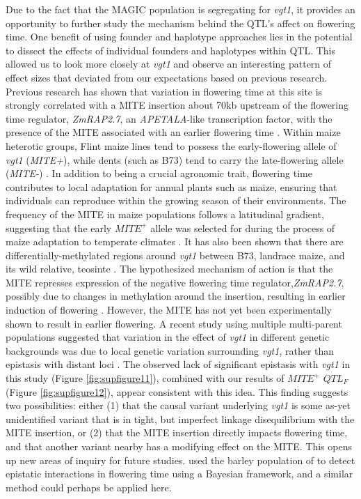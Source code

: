 \documentclass[9pt,twocolumn,twoside]{gsag3jnl}
\begin{document}
Due to the fact that the MAGIC population is segregating for \emph{vgt1}, it provides an opportunity to further study the mechanism behind the QTL's affect on flowering time.
One benefit of using founder and haplotype approaches lies in the potential to dissect the effects of individual founders and haplotypes within QTL.
This allowed us to look more closely at \emph{vgt1} and observe an interesting pattern of effect sizes that deviated from our expectations based on previous research.
Previous research  has shown that variation in flowering time at this site is strongly correlated with a MITE insertion about 70kb upstream of the flowering time regulator, \emph{ZmRAP2.7}, an \emph{APETALA}-like transcription factor, with the presence of the MITE associated with an earlier flowering time \citep{Castelletti}.
Within maize heterotic groups, Flint maize lines tend to possess the early-flowering allele of \emph{vgt1} (\emph{MITE+}), while dents (such as B73) tend to carry the late-flowering allele (\emph{MITE-}) \citep{Salvi}.
In addition to being a crucial agronomic trait, flowering time contributes to local adaptation for annual plants such as maize, ensuring that individuals can reproduce within the growing season of their environments.
The frequency of the MITE in maize populations follows a latitudinal gradient, suggesting that the early $MITE^+$ allele was selected for during the process of maize adaptation to temperate climates \citep{Navarro}.
It has also been shown that there are differentially-methylated regions around \emph{vgt1} between B73, landrace maize, and its wild relative, teosinte \citep{Xu}.
The hypothesized mechanism of action is that the MITE represses expression of the negative flowering time regulator,\emph{ZmRAP2.7}, possibly due to changes in methylation around the insertion, resulting in earlier induction of flowering \citep{Castelletti}.
However, the MITE has not yet been experimentally shown to result in earlier flowering.
A recent study using multiple multi-parent populations suggested that variation in the effect of \emph{vgt1} in different genetic backgrounds was due to local genetic variation surrounding \emph{vgt1}, rather than epistasis with distant loci \citep{Rio}.
The observed lack of significant epistasis with \emph{vgt1} in this study (Figure \ref{fig:supfigure11}), combined with our results of $MITE^+$ $QTL_F$ (Figure \ref{fig:supfigure12}), appear consistent with this idea.
This finding suggests two possibilities: either (1) that the causal variant underlying \emph{vgt1} is some as-yet unidentified variant that is in tight, but imperfect linkage disequilibrium with the MITE insertion, or (2) that the MITE insertion directly impacts flowering time, and that another variant nearby has a modifying effect on the MITE.
This opens up new areas of inquiry for future studies. \citep{Mathew} used the barley population of \cite{Sannemann} to detect epistatic interactions in flowering time using a Bayesian framework, and a similar method could perhaps be applied here.
\end{document}
